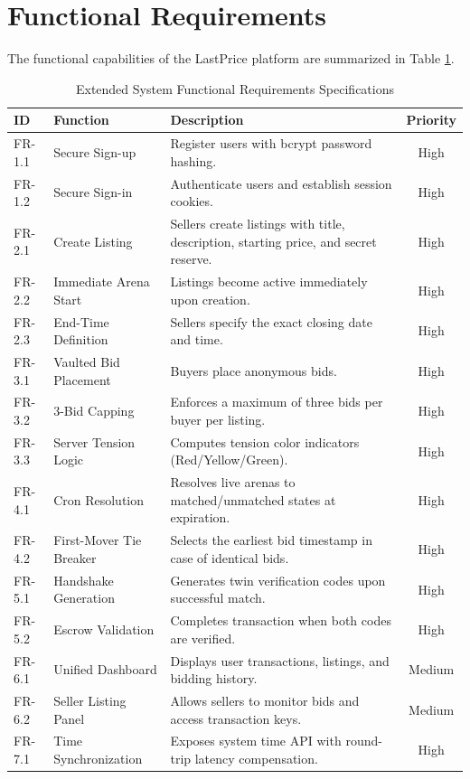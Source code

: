 \documentclass[12pt,a4paper,oneside]{report}
\begin{document}
\section{Functional Requirements}
The functional capabilities of the LastPrice platform are summarized in Table \ref{tab:functional_req_extended}.

\begin{table}[H]
\centering
\caption{Extended System Functional Requirements Specifications}
\label{tab:functional_req_extended}
\small
\begin{tabular}{lp{3.5cm}p{6.0cm}c}
\toprule
\textbf{ID} & \textbf{Function} & \textbf{Description} & \textbf{Priority} \\
\midrule
FR-1.1 & Secure Sign-up & Register users with bcrypt password hashing. & High \\
FR-1.2 & Secure Sign-in & Authenticate users and establish session cookies. & High \\
FR-2.1 & Create Listing & Sellers create listings with title, description, starting price, and secret reserve. & High \\
FR-2.2 & Immediate Arena Start & Listings become active immediately upon creation. & High \\
FR-2.3 & End-Time Definition & Sellers specify the exact closing date and time. & High \\
FR-3.1 & Vaulted Bid Placement & Buyers place anonymous bids. & High \\
FR-3.2 & 3-Bid Capping & Enforces a maximum of three bids per buyer per listing. & High \\
FR-3.3 & Server Tension Logic & Computes tension color indicators (Red/Yellow/Green). & High \\
FR-4.1 & Cron Resolution & Resolves live arenas to matched/unmatched states at expiration. & High \\
FR-4.2 & First-Mover Tie Breaker & Selects the earliest bid timestamp in case of identical bids. & High \\
FR-5.1 & Handshake Generation & Generates twin verification codes upon successful match. & High \\
FR-5.2 & Escrow Validation & Completes transaction when both codes are verified. & High \\
FR-6.1 & Unified Dashboard & Displays user transactions, listings, and bidding history. & Medium \\
FR-6.2 & Seller Listing Panel & Allows sellers to monitor bids and access transaction keys. & Medium \\
FR-7.1 & Time Synchronization & Exposes system time API with round-trip latency compensation. & High \\
\bottomrule
\end{tabular}
\end{table}
\end{document}
